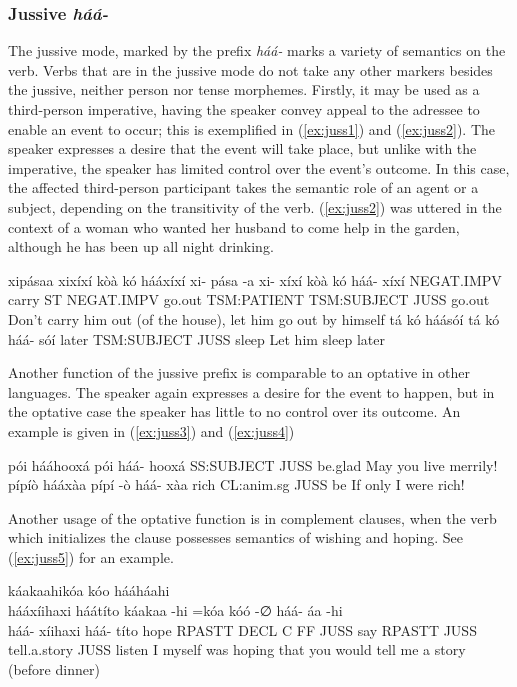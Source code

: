 \documentclass[a4paper, 12pt, oneside]{memoir}
\newcommand{\emh}[1]{\textit{#1}}
\begin{document}
\subsubsection{Jussive \emh{háá-}}
The jussive mode, marked by the prefix \emh{háá-} marks a variety of semantics on the verb. Verbs that are in the jussive mode do not take any other markers besides the jussive, neither person nor tense morphemes. Firstly, it may be used as a third-person imperative, having the speaker convey appeal to the adressee to enable an event to occur; this is exemplified in (\ref{ex:juss1}) and (\ref{ex:juss2}). The speaker expresses a desire that the event will take place, but unlike with the imperative, the speaker has limited control over the event's outcome. In this case, the affected third-person participant takes the semantic role of an agent or a subject, depending on the transitivity of the verb. (\ref{ex:juss2}) was uttered in the context of a woman who wanted her husband to come help in the garden, although he has been up all night drinking.
\begin{examples}
    \ex \label{ex:juss1}
    \words xipásaa xixíxí kòà kó hááxíxí
    \bits xi- pása -a xi- xíxí kòà kó háá- xíxí
    \gloss NEGAT.IMPV carry ST NEGAT.IMPV go.out TSM:PATIENT TSM:SUBJECT JUSS go.out
    \tr Don't carry him out (of the house), let him go out by himself
    \ex \label{ex:juss2}
    \words tá kó háásóí
    \bits tá kó háá- sóí
    \gloss later TSM:SUBJECT JUSS sleep 
    \tr Let him sleep later
\end{examples}
Another function of the jussive prefix is comparable to an optative in other languages. The speaker again expresses a desire for the event to happen, but in the optative case the speaker has little to no control over its outcome. An example is given in (\ref{ex:juss3}) and (\ref{ex:juss4})
\begin{examples}
    \ex \label{ex:juss3}
    \words pói hááhooxá
    \bits pói háá- hooxá 
    \gloss SS:SUBJECT JUSS be.glad
    \tr May you live merrily!
    \ex \label{ex:juss4}
    \words pípíò hááxàa
    \bits pípí -ò háá- xàa
    \gloss rich CL:anim.sg JUSS be 
    \tr If only I were rich!
\end{examples}
Another usage of the optative function is in complement clauses, when the verb which initializes the clause possesses semantics of wishing and hoping. See (\ref{ex:juss5}) for an example.
\begin{examples}
    \ex \label{ex:juss5}
    \words káakaahikóa kóo hááháahi \\ hááxíihaxi háátíto
    \bits káakaa -hi =kóa kóó -∅ háá- áa -hi \\ háá- xíihaxi háá- títo
    \gloss hope RPASTT DECL C FF JUSS say RPASTT JUSS tell.a.story JUSS listen
    \tr I myself was hoping that you would tell me a story (before dinner)
\end{examples}
\end{document}
